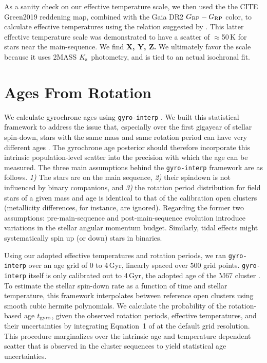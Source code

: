 \documentclass[11pt,twocolumn,tighten]{aastex63}
\begin{document}
As a sanity check on our effective temperature scale, we then used the 
the CITE Green2019 reddening map, combined with the Gaia DR2 $G_{\rm
BP}-G_{\rm RP}$ color, to calculate effective temperatures using the
relation suggested by \citet{Curtis_2020}.
This latter effective temperature scale was demonstrated to have a 
scatter of $\approx$50\,K for stars near the main-sequence.
We find {\bf X, Y, Z.}
We ultimately favor the \citet{Berger_2020a_catalog} scale
because it uses 2MASS $K_{\rm s}$ photometry, and is tied to an actual
isochronal fit.




\section{Ages From Rotation}
\label{sec:rotage}

We calculate gyrochrone ages using \texttt{gyro-interp}
\citep{Bouma_2023}.  We built this statistical framework to address
the issue that, especially over the first gigayear of stellar
spin-down, stars with the same mass and same rotation period can have
very different ages \citep[e.g.][]{Curtis_2019_ngc6811}.  The
gyrochrone age posterior should therefore incorporate this intrinsic
population-level scatter into the precision with which the age can be
measured.  The three main assumptions behind the \texttt{gyro-interp}
framework are as follows.  {\it 1)} The stars are on the main
sequence, {\it 2)} their spindown is not influenced by binary
companions, and {\it 3)} the rotation period distribution for field
stars of a given mass and age is identical to that of the calibration
open clusters (metallicity differences, for instance, are ignored).  
Regarding the former two assumptions: pre-main-sequence and
post-main-sequence evolution introduce variations in the stellar
angular momentum budget.  Similarly, tidal effects might
systematically spin up (or down) stars in binaries.

Using our adopted effective temperatures and rotation periods, we ran
\texttt{gyro-interp} over an age grid of 0 to 4\,Gyr, linearly spaced
over 500 grid points.  \texttt{gyro-interp} itself is only calibrated
out to 4\,Gyr, the adopted age of the M67 cluster
\citep[see][]{Dungee_2022,Gruner_2023}.  To estimate the stellar
spin-down rate as a function of time and stellar temperature, this
framework interpolates between reference open clusters using smooth
cubic hermite polynomials.  We calculate the probability of the
rotation-based age $t_{\rm gyro}$, given the observed rotation
periods, effective temperatures, and their uncertainties by
integrating Equation~1 of \citep{Bouma_2023} at the default grid
resolution.  This procedure marginalizes over the intrinsic age and
temperature dependent scatter that is observed in the cluster
sequences to yield statistical age uncertainties.
\end{document}
